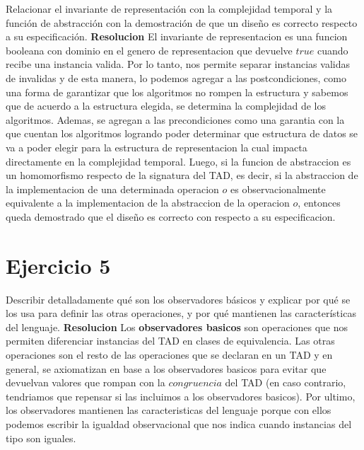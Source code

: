 \documentclass[10pt,a4paper]{article}
\begin{document}
Relacionar el invariante de representación con la complejidad temporal y la función de abstracción con la demostración de que un diseño es correcto respecto a su especificación.
\newline
\newline
\textbf{Resolucion}
\newline
\newline
El invariante de representacion es una funcion booleana con dominio en el genero de representacion que devuelve $true$ cuando recibe una instancia valida. Por lo tanto, nos permite separar instancias validas de invalidas y de esta manera, lo podemos agregar a las postcondiciones, como una forma de garantizar que los algoritmos no rompen la estructura y sabemos que de acuerdo a la estructura elegida, se determina la complejidad de los algoritmos. Ademas, se agregan a las precondiciones como una garantia con la que cuentan los algoritmos logrando poder determinar que estructura de datos se va a poder elegir para la estructura de representacion la cual impacta directamente en la complejidad temporal.   
\newline
\newline
Luego, si la funcion de abstraccion es un homomorfismo respecto de la signatura del TAD, es decir, si la abstraccion de la implementacion de una determinada operacion $o$ es observacionalmente equivalente a la implementacion de la abstraccion de la operacion $o$, entonces queda demostrado que el diseño es correcto con respecto a su especificacion. 
\newpage

\section{Ejercicio 5}

Describir detalladamente qué son los observadores básicos y explicar por qué se los usa para definir las otras operaciones, y por qué mantienen las características del lenguaje.
\newline
\newline
\textbf{Resolucion}
\newline
\newline
Los \textbf{observadores basicos} son operaciones que nos permiten diferenciar instancias del TAD en clases de equivalencia. Las otras operaciones son el resto de las operaciones que se declaran en un TAD y en general, se axiomatizan en base a los observadores basicos para evitar que devuelvan valores que rompan con la $congruencia$ del TAD (en caso contrario, tendriamos que repensar si las incluimos a los observadores basicos). Por ultimo, los observadores mantienen las caracteristicas del lenguaje porque con ellos podemos escribir la igualdad observacional que nos indica cuando instancias del tipo son iguales. 
\end{document}
